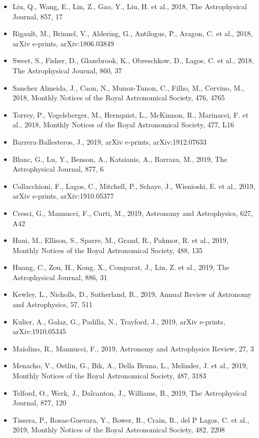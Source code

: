 \documentclass{letter}
\begin{document}
\begin{enumerate}
\begin{itemize}
\item Liu, Q., Wang, E., Lin, Z., Gao, Y., Liu, H. et al., 2018, The Astrophysical Journal, 857, 17
\item Rigault, M., Brinnel, V., Aldering, G., Antilogus, P., Aragon, C. et al., 2018, arXiv e-prints, arXiv:1806.03849
\item Sweet, S., Fisher, D., Glazebrook, K., Obreschkow, D., Lagos, C. et al., 2018, The Astrophysical Journal, 860, 37
\item Sanchez Almeida, J., Caon, N., Munoz-Tunon, C., Filho, M., Cervino, M., 2018, Monthly Notices of the Royal Astronomical Society, 476, 4765
\item Torrey, P., Vogelsberger, M., Hernquist, L., McKinnon, R., Marinacci, F. et al., 2018, Monthly Notices of the Royal Astronomical Society, 477, L16
\item Barrera-Ballesteros, J., 2019, arXiv e-prints, arXiv:1912.07633
\item Blanc, G., Lu, Y., Benson, A., Katsianis, A., Barraza, M., 2019, The Astrophysical Journal, 877, 6
\item Collacchioni, F., Lagos, C., Mitchell, P., Schaye, J., Wisnioski, E. et al., 2019, arXiv e-prints, arXiv:1910.05377
\item Cresci, G., Mannucci, F., Curti, M., 2019, Astronomy and Astrophysics, 627, A42
\item Hani, M., Ellison, S., Sparre, M., Grand, R., Pakmor, R. et al., 2019, Monthly Notices of the Royal Astronomical Society, 488, 135
\item Huang, C., Zou, H., Kong, X., Comparat, J., Lin, Z. et al., 2019, The Astrophysical Journal, 886, 31
\item Kewley, L., Nicholls, D., Sutherland, R., 2019, Annual Review of Astronomy and Astrophysics, 57, 511
\item Kulier, A., Galaz, G., Padilla, N., Trayford, J., 2019, arXiv e-prints, arXiv:1910.05345
\item Maiolino, R., Mannucci, F., 2019, Astronomy and Astrophysics Review, 27, 3
\item Menacho, V., Ostlin, G., Bik, A., Della Bruna, L., Melinder, J. et al., 2019, Monthly Notices of the Royal Astronomical Society, 487, 3183
\item Telford, O., Werk, J., Dalcanton, J., Williams, B., 2019, The Astrophysical Journal, 877, 120
\item Tissera, P., Rosas-Guevara, Y., Bower, R., Crain, R., del P Lagos, C. et al., 2019, Monthly Notices of the Royal Astronomical Society, 482, 2208

\end{itemize}
\end{enumerate}
\end{document}
